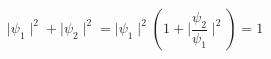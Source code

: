 \begin{equation}
\mid \psi_1\mid^2 + \mid \psi_2\mid^2=\mid \psi_1\mid^2 (1+\mid \frac{\psi_2}{\psi_1}\mid^2)=1
\end{equation}

